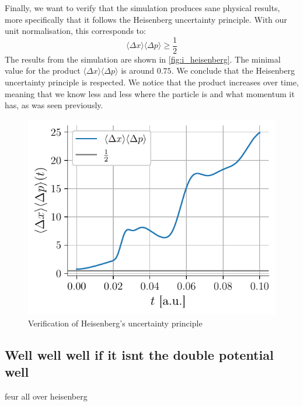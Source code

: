 Finally, we want to verify that the simulation produces sane physical results, more specifically that it follows the Heisenberg uncertainty principle. With our unit normalisation, this corresponds to:
\begin{equation}
    \langle \Delta x \rangle \langle \Delta p \rangle \ge \frac{1}{2}
\end{equation}
The results from the simulation are shown in \autoref{fig:i_heisenberg}. The minimal value for the product \(\langle \Delta x \rangle \langle \Delta p \rangle\) is around \(0.75\). We conclude that the Heisenberg uncertainty principle is respected. We notice that the product increases over time, meaning that we know less and less where the particle is and what momentum it has, as was seen previously.

\begin{figure}[h]
    \centering
    \includegraphics[width=0.6\linewidth]{figures/i_heisenberg.pdf}
    \caption{Verification of Heisenberg's uncertainty principle}
    \label{fig:i_heisenberg}
\end{figure}

\subsection{Well well well if it isnt the double potential well}

feur all over heisenberg
